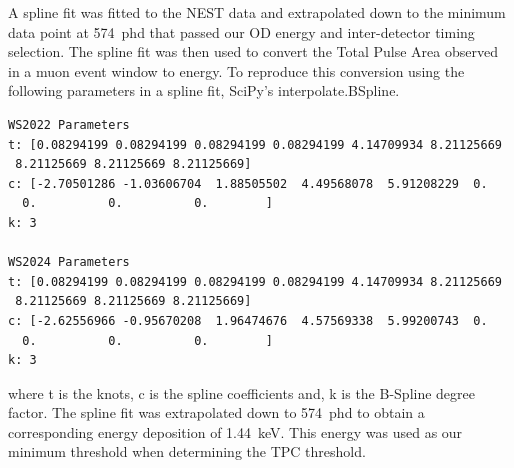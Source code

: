 A spline fit was fitted to the NEST data and extrapolated down to the minimum data point at 574~phd that passed our OD energy and inter-detector timing selection. The spline fit was then used to convert the Total Pulse Area observed in a muon event window to energy. To reproduce this conversion using the following parameters in a spline fit, SciPy's {\asciifamily interpolate.BSpline}.
\begin{lstlisting}
WS2022 Parameters
t: [0.08294199 0.08294199 0.08294199 0.08294199 4.14709934 8.21125669
 8.21125669 8.21125669 8.21125669]
c: [-2.70501286 -1.03606704  1.88505502  4.49568078  5.91208229  0.
  0.          0.          0.        ]
k: 3

WS2024 Parameters
t: [0.08294199 0.08294199 0.08294199 0.08294199 4.14709934 8.21125669
 8.21125669 8.21125669 8.21125669]
c: [-2.62556966 -0.95670208  1.96474676  4.57569338  5.99200743  0.
  0.          0.          0.        ]
k: 3
\end{lstlisting}
where {\asciifamily t} is the knots, {\asciifamily c} is the spline coefficients and, {\asciifamily k} is the B-Spline degree factor.
The spline fit was extrapolated down to 574~phd to obtain a corresponding energy deposition of 1.44~keV. This energy was used as our minimum threshold when determining the TPC threshold.

